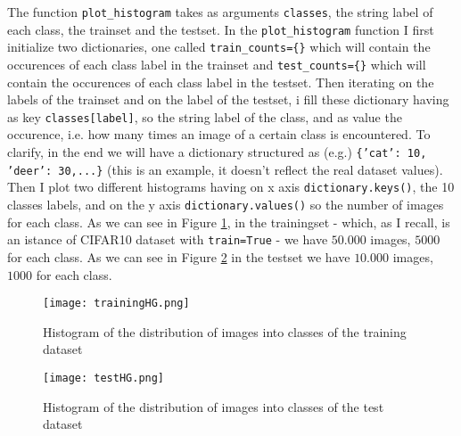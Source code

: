 \documentclass[a4paper]{article}
\begin{document}
\begin{enumerate}
    \newline The function \texttt{plot\_histogram} takes as arguments \texttt{classes}, the string label of each class, the trainset and the testset. In the \texttt{plot\_histogram} function I first initialize two dictionaries, one called \texttt{train\_counts=\{\}} which will contain the occurences of each class label in the trainset and \texttt{test\_counts=\{\}} which will contain the occurences of each class label in the testset. Then iterating on the labels of the trainset and on the label of the testset, i fill these dictionary having as key \texttt{classes[label]}, so the string label of the class, and as value the occurence, i.e. how many times an image of a certain class is encountered. To clarify, in the end we will have a dictionary structured as (e.g.) \texttt{\{'cat': 10, 'deer': 30,...\}} (this is an example, it doesn't reflect the real dataset values). Then I plot two different histograms having on x axis \texttt{dictionary.keys()}, the 10 classes labels, and on the y axis \texttt{dictionary.values()} so the number of images for each class. As we can see in Figure \ref{fig:trainHG}, in the trainingset - which, as I recall, is an istance of CIFAR10 dataset with \texttt{train=True} - we have $50.000$ images, $5000$ for each class. As we can see in Figure \ref{fig:testHG} in the testset we have $10.000$ images, $1000$ for each class.

    \begin{figure}[h]
        \centering
        \texttt{[image: trainingHG.png]}
        \caption{Histogram of the distribution of images into classes of the training dataset}
        \label{fig:trainHG}
    \end{figure}

    \begin{figure}[h]
        \centering
        \texttt{[image: testHG.png]}
        \caption{Histogram of the distribution of images into classes of the test dataset}
        \label{fig:testHG}
    \end{figure}


\end{enumerate}
\end{document}
